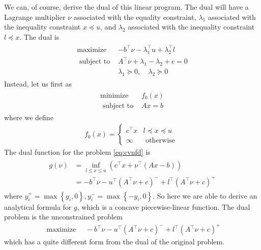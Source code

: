\documentclass{article}
\begin{document}
\begin{exma}
We can, of course, derive the dual of this linear program. The dual will have a Lagrange multiplier $\nu$ associated with the equality constraint, $\lambda_{1}$ associated with the inequality constraint $x \preceq u$, and $\lambda_{2}$ associated with the inequality constraint $l \preceq x$. The dual is
\begin{align*}
\begin{array}{cl}
\operatorname{maximize} & -b^{\top} \nu-\lambda_{1}^{\top} u+\lambda_{2}^{\top} l \\
\text { subject to } & A^{\top} \nu+\lambda_{1}-\lambda_{2}+c=0 \\
& \lambda_{1} \succeq 0, \quad \lambda_{2} \succeq 0
\end{array}
\end{align*}
Instead, let us first  as
\begin{align*}
\begin{array}{ll}
\operatorname{minimize} & f_{0}(x) \\
\text { subject to } & A x=b
\end{array}
\end{align*}
where we define
\begin{align}
f_{0}(x)= \begin{cases}c^{\top} x & l \preceq x \preceq u \\ \infty & \text { otherwise }\end{cases}\label{eq:cvnfd}
\end{align}
The dual function for the problem \cref{eq:cvnfd} is
\begin{align*}
\begin{aligned}
g(\nu) &=\inf _{l \leq x \leq u}\left(c^{\top} x+\nu^{\top}(A x-b)\right) \\
&=-b^{\top} \nu-u^{\top}\left(A^{\top} \nu+c\right)^{-}+l^{\top}\left(A^{\top} \nu+c\right)^{+}
\end{aligned}
\end{align*}
where $y_{i}^{+}=\max \left\{y_{i}, 0\right\}, y_{i}^{-}=\max \left\{-y_{i}, 0\right\}$. So here we are able to derive an analytical formula for $g$, which is a concave piecewise-linear function.
The dual problem is the unconstrained problem
\begin{align*}
\text { maximize } \quad-b^{\top} \nu-u^{\top}\left(A^{\top} \nu+c\right)^{-}+l^{\top}\left(A^{\top} \nu+c\right)^{+}
\end{align*}
which has a quite different form from the dual of the original problem.
\end{exma}
\end{document}
